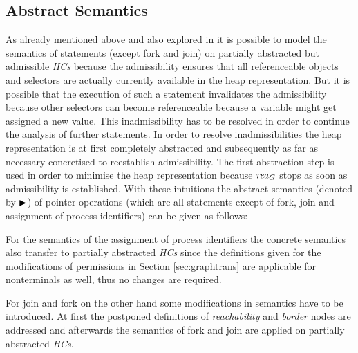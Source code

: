 	\subsection{Abstract Semantics}
	\label{sec:abstractsemantics}
	As already mentioned above and also explored in \cite{fmsd} it is possible
	to model the semantics of statements (except fork and join) on partially
	abstracted but admissible \emph{\acp{HC}} because the admissibility ensures
	that all referenceable objects and selectors are actually currently
	available in the heap representation. But it is possible that the execution
	of such a statement invalidates the admissibility because other selectors
	can become
	referenceable because a variable might get assigned a new value. This
	inadmissibility has to be resolved in order to continue the analysis of
	further statements. In order to resolve inadmissibilities the heap
	representation is at first completely abstracted and subsequently as far as
	necessary concretised to reestablish admissibility. The first abstraction
	step is used in order to minimise the heap representation because $\rea_{G}$
	stops as soon as admissibility is established.
	With these intuitions the abstract semantics (denoted by $\btr$) of pointer
	operations (which are all statements except of fork, join and assignment of
	process identifiers) can be given as follows:
	\begin{prooftree}
	\end{prooftree}
	For the semantics of the assignment of process identifiers the concrete
	semantics also transfer to partially abstracted \emph{\acp{HC}} since the
	definitions given for the modifications of permissions in Section
	\ref{sec:graphtrans} are applicable for nonterminals as well, thus no
	changes are required.

	For join and fork on the other hand some modifications in semantics have to
	be introduced. At first the postponed definitions of \emph{reachability} and
	\emph{border} nodes are addressed and afterwards the semantics of fork and
	join are applied on partially abstracted \emph{\acp{HC}}.

